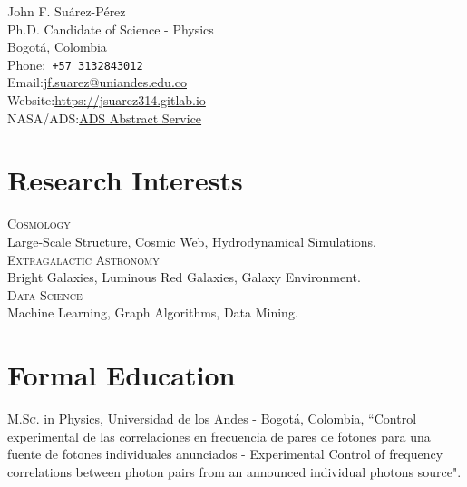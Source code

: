 \documentclass[10pt, a4paper]{article}
\newcommand{\years}[1]{\marginnote{\scriptsize #1}}
\begin{document}
{\LARGE John F. Suárez-Pérez}\\[1cm]
Ph.D. Candidate of Science - Physics \\
Bogotá, Colombia\\[.2cm]
Phone:\hspace{0.2cm}\texttt{ +57 3132843012 }\\
Email:\hspace{0.5cm}\href{mailto:jf.suarez@uniandes.edu.co}{jf.suarez@uniandes.edu.co}\\
Website:\hspace{0.16cm}\href{https://jsuarez314.gitlab.io}{https://jsuarez314.gitlab.io}\\
NASA/ADS:\hspace{0.16cm}\href{https://ui.adsabs.harvard.edu/search/p_=0&q=\%20author\%3A\%22Su\%C3\%A1rez-P\%C3\%A9rez\%2C\%20John\%20F.\%22&sort=date\%20desc\%2C\%20bibcode\%20desc}{ADS Abstract Service}


\section*{Research Interests}
\noindent
\textsc{Cosmology}\\
 Large-Scale Structure, Cosmic Web, Hydrodynamical Simulations.\\

\textsc{Extragalactic Astronomy}\\
Bright Galaxies, Luminous Red Galaxies, Galaxy Environment.\\

\textsc{Data Science}\\
Machine Learning, Graph Algorithms, Data Mining.

\section*{Formal Education}
\noindent
\years{2018}\textsc{M.Sc.} in Physics, Universidad de los Andes - Bogotá, Colombia, “Control experimental de las correlaciones en frecuencia de pares de fotones para una fuente de fotones individuales anunciados - Experimental Control of frequency correlations between photon pairs from an announced individual photons source".\\
\end{document}
